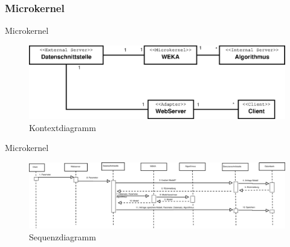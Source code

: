 \documentclass{beamer}
\begin{document}
		\subsubsection{Microkernel}
		\begin{frame}{Microkernel}
			\begin{figure}
				\centering
				\includegraphics[width=0.7\linewidth]{Grafik/Diagramm/Microkernel}
				\caption{Kontextdiagramm}
				\label{fig:Kontext2}
			\end{figure}
		\end{frame}
		\begin{frame}{Microkernel}
			\begin{figure}[h]	
				\includegraphics[width=1\linewidth]{Grafik/Diagramm/Szenarios/Berechnung3}
				\caption{Sequenzdiagramm}
				\label{fig:Sequenz2}
			\end{figure}
		\end{frame}
		
		
\end{document}

